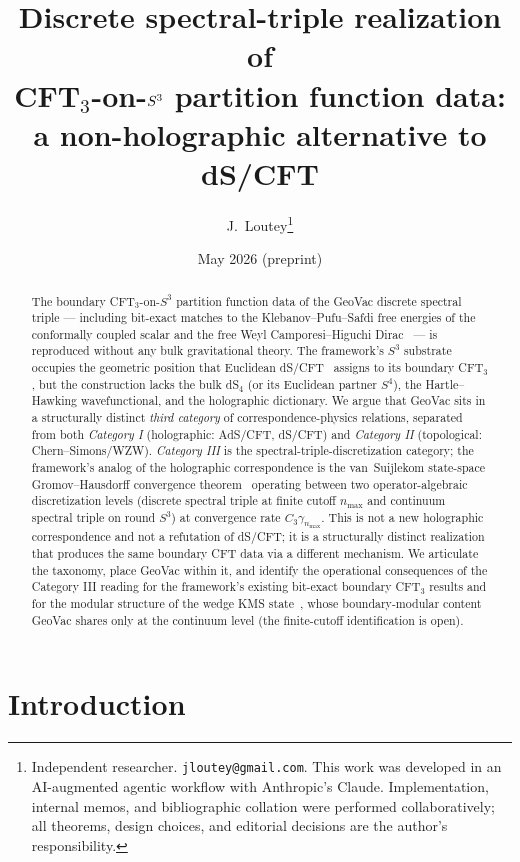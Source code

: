 \documentclass[11pt,a4paper]{article}
\title{Discrete spectral-triple realization of\\
CFT$_{3}$-on-$\sthree$ partition function data:\\
a non-holographic alternative to dS/CFT}
\author{J.~Loutey\thanks{Independent researcher.
\texttt{jloutey@gmail.com}. This work was developed in an
AI-augmented agentic workflow with Anthropic's Claude.
Implementation, internal memos, and bibliographic collation were
performed collaboratively; all theorems, design choices, and editorial
decisions are the author's responsibility.}}
\date{May 2026 (preprint)}
\theoremstyle{plain}
\theoremstyle{definition}
\newcommand{\nmax}{n_{\max}}
\newcommand{\sthree}{S^{3}}
\begin{document}
\maketitle

\begin{abstract}
The boundary CFT$_{3}$-on-$\sthree$ partition function data of the
GeoVac discrete spectral triple --- including bit-exact matches to the
Klebanov--Pufu--Safdi free energies of the conformally coupled scalar
and the free Weyl Camporesi--Higuchi Dirac~\cite{paper50,
klebanov_pufu_safdi2011} --- is reproduced without any bulk
gravitational theory. The framework's $\sthree$ substrate occupies
the geometric position that Euclidean dS/CFT~\cite{maldacena2002,
strominger2001} assigns to its boundary CFT$_{3}$, but the
construction lacks the bulk dS$_{4}$ (or its Euclidean partner $S^{4}$),
the Hartle--Hawking wavefunctional, and the holographic dictionary.
We argue that GeoVac sits in a structurally distinct \emph{third
category} of correspondence-physics relations, separated from both
\emph{Category I} (holographic: AdS/CFT, dS/CFT) and \emph{Category II}
(topological: Chern--Simons/WZW). \emph{Category III} is the
spectral-triple-discretization category; the framework's analog of the
holographic correspondence is the van~Suijlekom state-space
Gromov--Hausdorff convergence theorem~\cite{paper38} operating between two
operator-algebraic discretization levels (discrete spectral triple at
finite cutoff $\nmax$ and continuum spectral triple on round
$\sthree$) at convergence rate $C_{3} \gamma_{\nmax}$. This is not a
new holographic correspondence and not a refutation of dS/CFT; it is
a structurally distinct realization that produces the same boundary
CFT data via a different mechanism. We articulate the taxonomy, place
GeoVac within it, and identify the operational consequences of the
Category III reading for the framework's existing bit-exact boundary
CFT$_{3}$ results and for the modular structure of the wedge KMS
state~\cite{paper42}, whose boundary-modular content GeoVac
shares only at the continuum level (the finite-cutoff identification is
open).
\end{abstract}

\tableofcontents

\section{Introduction}
\label{sec:intro}
\end{document}
